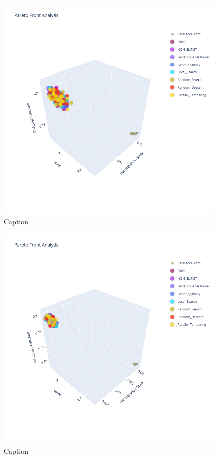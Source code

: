 \begin{figure}
    \centering
    \includegraphics[width=\textwidth]{images/3d_soa_2000.png}
    \caption{Caption}
    \label{fig:my_label}
\end{figure}

\begin{figure}
    \centering
    \includegraphics[width=\textwidth]{images/3d_soa_10001.png}
    \caption{Caption}
    \label{fig:my_label}
\end{figure}

